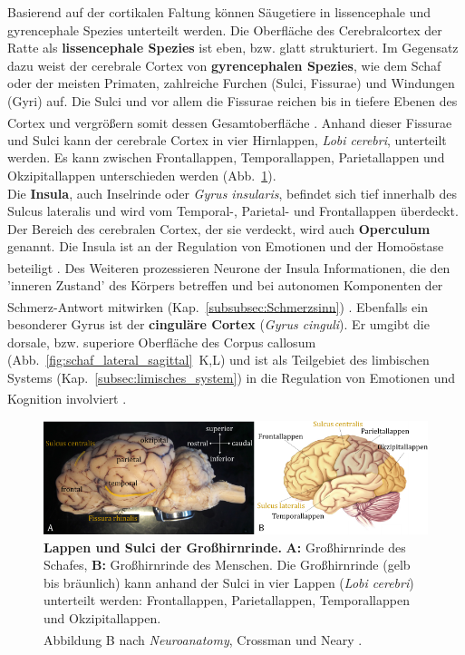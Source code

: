 Basierend auf der cortikalen Faltung können Säugetiere in lissencephale und gyrencephale Spezies unterteilt werden. Die Oberfläche des Cerebralcortex der Ratte als \textbf{lissencephale Spezies} ist eben, bzw. glatt strukturiert. Im Gegensatz dazu weist der cerebrale Cortex von \textbf{gyrencephalen Spezies}, wie dem Schaf oder der meisten Primaten, zahlreiche Furchen (Sulci, Fissurae) und Windungen (Gyri) auf. Die Sulci und vor allem die Fissurae reichen bis in tiefere Ebenen des Cortex und vergrößern somit dessen Gesamtoberfläche \textsuperscript{\cite[Kap.~7]{watson2010thebrain}}. Anhand dieser Fissurae und Sulci kann der cerebrale Cortex in vier Hirnlappen, \textit{Lobi cerebri}, unterteilt werden. Es kann zwischen Frontallappen, Temporallappen, Parietallappen und Okzipitallappen unterschieden werden (Abb.~\ref{fig:cortex_lappen}).\\

\noindent Die \textbf{Insula}, auch Inselrinde oder \textit{Gyrus insularis}, befindet sich tief innerhalb des Sulcus lateralis und wird vom Temporal-, Parietal- und Frontallappen überdeckt. Der Bereich des cerebralen Cortex, der sie verdeckt, wird auch \textbf{Operculum} genannt. Die Insula ist an der Regulation von Emotionen und der Homoöstase beteiligt \textsuperscript{\cite[Kap.~15]{kandel2013principles}}. Des Weiteren prozessieren Neurone der Insula Informationen, die den 'inneren Zustand' des Körpers betreffen und bei autonomen Komponenten der Schmerz-Antwort mitwirken (Kap.~\ref{subsubsec:Schmerzsinn}) \textsuperscript{\cite[Kap.~24]{kandel2013principles}}. Ebenfalls ein besonderer Gyrus ist der \textbf{cinguläre Cortex} (\textit{Gyrus cinguli}). Er umgibt die dorsale, bzw. superiore Oberfläche des Corpus callosum (Abb.~\ref{fig:schaf_lateral_sagittal}~K,L) und ist als Teilgebiet des limbischen Systems (Kap.~\ref{subsec:limisches_system}) in die Regulation von Emotionen und Kognition involviert \textsuperscript{\cite[Kap.~15]{kandel2013principles}}.

\begin{figure}[H]
	\centering
	\includegraphics[width=\textwidth]{pictures/Bilder_Jule/Andere/grosshirnrinde.png}
	\caption[Lappen und Sulci der Großhirnrinde]{\textbf{Lappen und Sulci der Großhirnrinde.} \textbf{A:} Großhirnrinde des Schafes, \textbf{B:} Großhirnrinde des Menschen. Die Großhirnrinde (gelb bis bräunlich) kann anhand der Sulci in vier Lappen (\textit{Lobi cerebri}) unterteilt werden: Frontallappen, Parietallappen, Temporallappen und Okzipitallappen. \\
	Abbildung B nach \textit{Neuroanatomy}, Crossman und Neary \textsuperscript{\cite[Kap.~7]{crossman2014neuroanatomy}}.}
	\label{fig:cortex_lappen} 
\end{figure}


